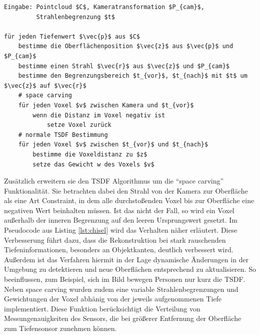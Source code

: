 \begin{lstlisting}[mathescape,caption=Chisel TSDF Algorithmus, label=lst:chisel]
Eingabe: Pointcloud $C$, Kameratransformation $P_{cam}$, 
         Strahlenbegrenzung $t$

für jeden Tiefenwert $\vec{p}$ aus $C$
    bestimme die Oberflächenposition $\vec{z}$ aus $\vec{p}$ und $P_{cam}$
    bestimme einen Strahl $\vec{r}$ aus $\vec{z}$ und $P_{cam}$
    bestimme den Begrenzungsbereich $t_{vor}$, $t_{nach}$ mit $t$ um $\vec{z}$ auf $\vec{r}$
    # space carving
    für jeden Voxel $v$ zwischen Kamera und $t_{vor}$
        wenn die Distanz im Voxel negativ ist
            setze Voxel zurück
    # normale TSDF Bestimmung
    für jeden Voxel $v$ zwischen $t_{vor}$ und $t_{nach}$
        bestimme die Voxeldistanz zu $z$
        setze das Gewicht w des Voxels $v$
\end{lstlisting}

Zusätzlich erweitern sie den TSDF Algorithmus um die \enquote{space carving} Funktionalität. Sie betrachten dabei den Strahl von der Kamera zur Oberfläche als eine Art Constraint, in dem alle durchstoßenden Voxel bis zur Oberfläche eine negativen Wert beinhalten müssen. Ist das nicht der Fall, so wird ein Voxel außerhalb der inneren Begrenzung auf den leeren Ursprungswert gesetzt. Im Pseudocode aus Listing \ref{lst:chisel} wird das Verhalten näher erläutert. Diese Verbesserung führt dazu, dass die Rekonstruktion bei stark rauschenden Tiefeninformationen, besonders an Objektkanten, deutlich verbessert wird. Außerdem ist das Verfahren hiermit in der Lage dynamische Änderungen in der Umgebung zu detektieren und neue Oberflächen entsprechend zu aktualisieren. So beeinflussen, zum Beispiel, sich im Bild bewegen Personen nur kurz die TSDF. \citep{Klingensmith_2015_7924}\\

Neben space carving wurden zudem eine variable Strahlenbegrenzungen und Gewichtungen der Voxel abhänig von der jeweils aufgenommenen Tiefe implementiert. Diese Funktion berücksichtigt die Verteilung von Messungenauigkeiten des Sensors, die bei größerer Entfernung der Oberfläche zum Tiefensonsor zunehmen können. \citep{Klingensmith_2015_7924}